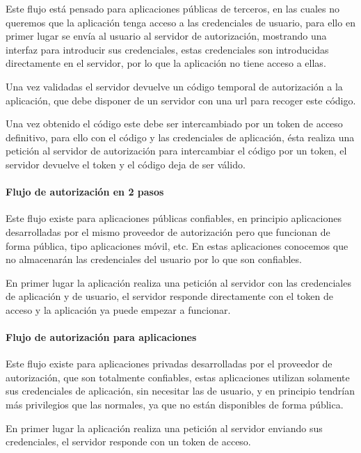 \documentclass[12pt,a4paperpaper,]{report}
\let\oldparagraph\paragraph
\renewcommand{\paragraph}[1]{\oldparagraph{#1}\mbox{}}
\begin{document}
Este flujo está pensado para aplicaciones públicas de terceros, en las
cuales no queremos que la aplicación tenga acceso a las credenciales de
usuario, para ello en primer lugar se envía al usuario al servidor de
autorización, mostrando una interfaz para introducir sus credenciales,
estas credenciales son introducidas directamente en el servidor, por lo
que la aplicación no tiene acceso a ellas.

Una vez validadas el servidor devuelve un código temporal de
autorización a la aplicación, que debe disponer de un servidor con una
url para recoger este código.

Una vez obtenido el código este debe ser intercambiado por un token de
acceso definitivo, para ello con el código y las credenciales de
aplicación, ésta realiza una petición al servidor de autorización para
intercambiar el código por un token, el servidor devuelve el token y el
código deja de ser válido.

\paragraph{Flujo de autorización en 2
pasos}\label{flujo-de-autorizaciuxf3n-en-2-pasos}

Este flujo existe para aplicaciones públicas confiables, en principio
aplicaciones desarrolladas por el mismo proveedor de autorización pero
que funcionan de forma pública, tipo aplicaciones móvil, etc. En estas
aplicaciones conocemos que no almacenarán las credenciales del usuario
por lo que son confiables.

En primer lugar la aplicación realiza una petición al servidor con las
credenciales de aplicación y de usuario, el servidor responde
directamente con el token de acceso y la aplicación ya puede empezar a
funcionar.

\paragraph{Flujo de autorización para
aplicaciones}\label{flujo-de-autorizaciuxf3n-para-aplicaciones}

Este flujo existe para aplicaciones privadas desarrolladas por el
proveedor de autorización, que son totalmente confiables, estas
aplicaciones utilizan solamente sus credenciales de aplicación, sin
necesitar las de usuario, y en principio tendrían más privilegios que
las normales, ya que no están disponibles de forma pública.

En primer lugar la aplicación realiza una petición al servidor enviando
sus credenciales, el servidor responde con un token de acceso.
\end{document}
